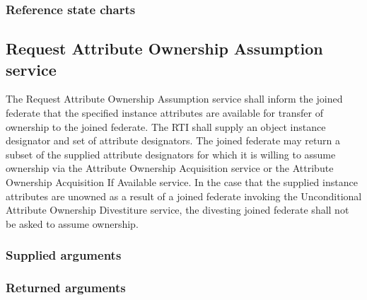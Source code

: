 \begin{compactstdpage}


    \subsubsection{Reference state charts}



    \subsection{Request Attribute Ownership Assumption \rtiinitiated{} service}


    The Request Attribute Ownership Assumption \rtiinitiated{} service shall inform the joined federate that the specified instance attributes are available for transfer of ownership to the joined federate. The RTI shall supply an object instance designator and set of attribute designators. The joined federate may return a subset of the supplied attribute designators for which it is willing to assume ownership via the Attribute Ownership Acquisition service or the Attribute Ownership Acquisition If Available service. In the case that the supplied instance attributes are unowned as a result of a joined federate invoking the Unconditional Attribute Ownership Divestiture service, the divesting joined federate shall not be asked to assume ownership.

    \subsubsection{Supplied arguments}



    \subsubsection{Returned arguments}




\end{compactstdpage}
